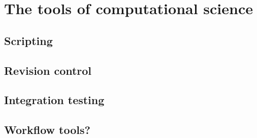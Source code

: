 \documentclass[a4paper,12pt]{article}
\theoremstyle{definition}
\begin{document}
\section{The tools of computational science}

\subsection{Scripting}

\subsection{Revision control}

\subsection{Integration testing}

\subsection{Workflow tools?}
\end{document}
